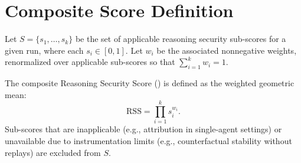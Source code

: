 \section{Composite Score Definition}
\label{app:composite}

Let $S=\{s_1,\dots,s_k\}$ be the set of applicable reasoning security sub-scores for a given run, where each $s_i\in[0,1]$. Let $w_i$ be the associated nonnegative weights, renormalized over applicable sub-scores so that $\sum_{i=1}^{k} w_i = 1$.

The composite Reasoning Security Score (\RSS) is defined as the weighted geometric mean:
\[
\mathrm{RSS}=\prod_{i=1}^{k} s_i^{w_i}.
\]
Sub-scores that are inapplicable (e.g., attribution in single-agent settings) or unavailable due to instrumentation limits (e.g., counterfactual stability without replays) are excluded from $S$.
